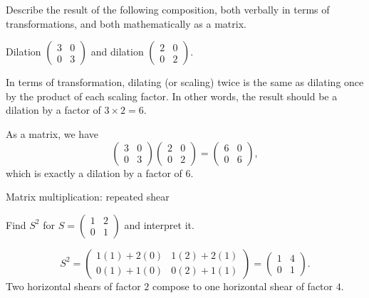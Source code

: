  
\begin{frame}[t] 
\begin{ex} 
Describe the result of the following composition, both verbally in terms of transformations, and both mathematically as a matrix.

\begin{center}
Dilation $\begin{pmatrix} 3 & 0 \\ 0 & 3 \end{pmatrix}$ and dilation $\begin{pmatrix} 2 & 0 \\ 0 & 2 \end{pmatrix}$.
\end{center}
\end{ex} 
\begin{sol}
In terms of transformation, dilating (or scaling) twice is the same as dilating once by the product of each scaling factor. In other words, the result should be a dilation by a factor of $3 \times 2 = 6$.

As a matrix, we have
\[\begin{pmatrix} 3 & 0 \\ 0 & 3 \end{pmatrix}\begin{pmatrix} 2 & 0 \\ 0 & 2 \end{pmatrix} = \begin{pmatrix} 6 & 0 \\ 0 & 6 \end{pmatrix},\]
which is exactly a dilation by a factor of 6.
\end{sol}
\end{frame}
\begin{frame}[t]{Matrix multiplication: repeated shear}
\small
\begin{ex}
Find $S^2$ for $S=\begin{pmatrix}1&2\\0&1\end{pmatrix}$ and interpret it.
\end{ex}
\begin{sol}
\[S^2=\begin{pmatrix}1(1)+2(0)&1(2)+2(1)\\0(1)+1(0)&0(2)+1(1)\end{pmatrix}=\begin{pmatrix}1&4\\0&1\end{pmatrix}.\] Two horizontal shears of factor $2$ compose to one horizontal shear of factor $4$.
\end{sol}
\end{frame}


